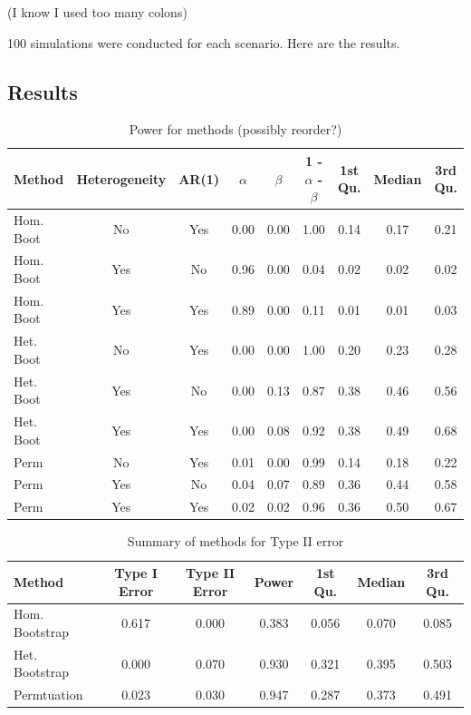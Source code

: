 \documentclass{article}
\begin{document}
(I know I used too many colons)

100 simulations were conducted for each scenario. Here are the results.


\subsection{Results}

\begin{table}[H]
\centering
\begin{tabular}{lcccccccc}
  \hline
Method & Heterogeneity & AR(1) & $\alpha$ & $\beta$ & 1 - $\alpha$ - $\beta$ & 1st Qu. & Median & 3rd Qu. \\ 
  \hline
Hom. Boot & No & Yes & 0.00 & 0.00 & 1.00 & 0.14 & 0.17 & 0.21 \\ 
  Hom. Boot & Yes & No & 0.96 & 0.00 & 0.04 & 0.02 & 0.02 & 0.02 \\ 
  Hom. Boot & Yes & Yes & 0.89 & 0.00 & 0.11 & 0.01 & 0.01 & 0.03 \\ 
  Het. Boot & No & Yes & 0.00 & 0.00 & 1.00 & 0.20 & 0.23 & 0.28 \\ 
  Het. Boot & Yes & No & 0.00 & 0.13 & 0.87 & 0.38 & 0.46 & 0.56 \\ 
  Het. Boot & Yes & Yes & 0.00 & 0.08 & 0.92 & 0.38 & 0.49 & 0.68 \\ 
  Perm & No & Yes & 0.01 & 0.00 & 0.99 & 0.14 & 0.18 & 0.22 \\ 
  Perm & Yes & No & 0.04 & 0.07 & 0.89 & 0.36 & 0.44 & 0.58 \\ 
  Perm & Yes & Yes & 0.02 & 0.02 & 0.96 & 0.36 & 0.50 & 0.67 \\  
   \hline
\end{tabular}
\caption{Power for methods (possibly reorder?)} 
\label{tab:power_methods}
\end{table}


\begin{table}[ht]
\centering
\begin{tabular}{lcccccc}
  \hline
Method & Type I Error & Type II Error & Power & 1st Qu. & Median & 3rd Qu. \\ 
  \hline
Hom. Bootstrap & 0.617 & 0.000 & 0.383 & 0.056 & 0.070 & 0.085 \\ 
  Het. Bootstrap & 0.000 & 0.070 & 0.930 & 0.321 & 0.395 & 0.503 \\ 
  Permtuation & 0.023 & 0.030 & 0.947 & 0.287 & 0.373 & 0.491 \\ 
   \hline
\end{tabular}
\caption{Summary of methods for Type II error} 
\label{tab:type_2_summary}
\end{table}
\end{document}
